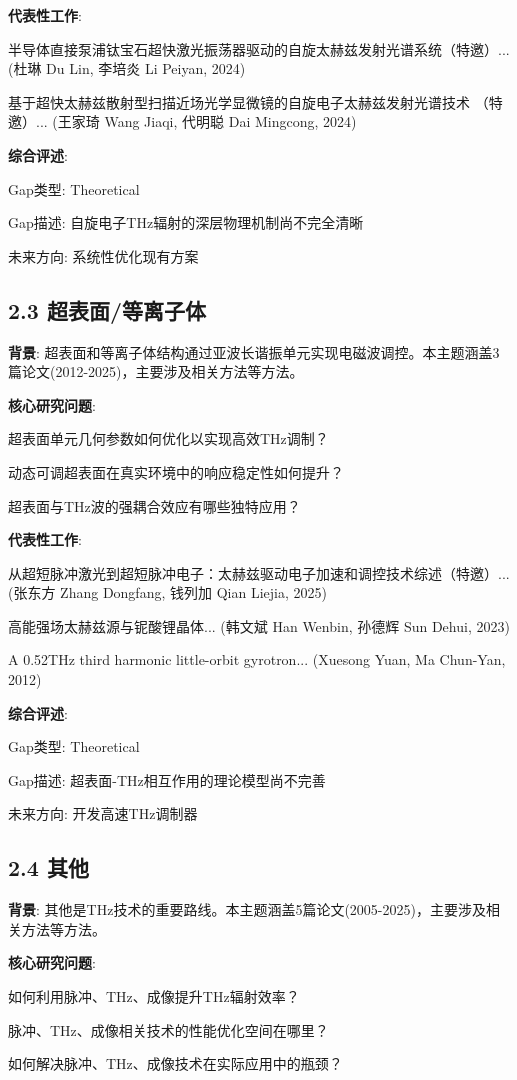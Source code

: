 \documentclass[12pt]{article}
\begin{document}
\textbf{代表性工作}:
\item [1] 半导体直接泵浦钛宝石超快激光振荡器驱动的自旋太赫兹发射光谱系统（特邀）... (杜琳 Du Lin, 李培炎 Li Peiyan, 2024)
\item [2] 基于超快太赫兹散射型扫描近场光学显微镜的自旋电子太赫兹发射光谱技术 （特邀）... (王家琦 Wang Jiaqi, 代明聪 Dai Mingcong, 2024)

\textbf{综合评述}:
\item Gap类型: Theoretical
\item Gap描述: 自旋电子THz辐射的深层物理机制尚不完全清晰
\item 未来方向: 系统性优化现有方案


\subsection{2.3 超表面/等离子体}

\textbf{背景}: 超表面和等离子体结构通过亚波长谐振单元实现电磁波调控。本主题涵盖3篇论文(2012-2025)，主要涉及相关方法等方法。

\textbf{核心研究问题}:
\item 超表面单元几何参数如何优化以实现高效THz调制？
\item 动态可调超表面在真实环境中的响应稳定性如何提升？
\item 超表面与THz波的强耦合效应有哪些独特应用？

\textbf{代表性工作}:
\item [1] 从超短脉冲激光到超短脉冲电子：太赫兹驱动电子加速和调控技术综述（特邀）... (张东方 Zhang Dongfang, 钱列加 Qian Liejia, 2025)
\item [2] 高能强场太赫兹源与铌酸锂晶体... (韩文斌 Han Wenbin, 孙德辉 Sun Dehui, 2023)
\item [3] A 0.52THz third harmonic little-orbit gyrotron... (Xuesong Yuan, Ma Chun-Yan, 2012)

\textbf{综合评述}:
\item Gap类型: Theoretical
\item Gap描述: 超表面-THz相互作用的理论模型尚不完善
\item 未来方向: 开发高速THz调制器


\subsection{2.4 其他}

\textbf{背景}: 其他是THz技术的重要路线。本主题涵盖5篇论文(2005-2025)，主要涉及相关方法等方法。

\textbf{核心研究问题}:
\item 如何利用脉冲、THz、成像提升THz辐射效率？
\item 脉冲、THz、成像相关技术的性能优化空间在哪里？
\item 如何解决脉冲、THz、成像技术在实际应用中的瓶颈？
\end{document}
